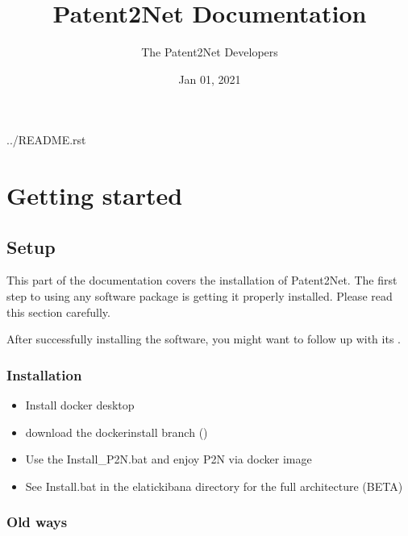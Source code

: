 \documentclass[letterpaper,10pt,english]{sphinxmanual}
\title{Patent2Net Documentation}
\date{Jan 01, 2021}
\author{The Patent2Net Developers}
\begin{document}
\pagestyle{empty}
\sphinxmaketitle
\pagestyle{plain}
\sphinxtableofcontents
\pagestyle{normal}
\label{\detokenize{index::doc}}


../README.rst


\chapter{Getting started}
\label{\detokenize{index:getting-started}}

\section{Setup}
\label{\detokenize{setup:setup}}\label{\detokenize{setup:id1}}\label{\detokenize{setup::doc}}
This part of the documentation covers the installation of Patent2Net.
The first step to using any software package is getting it properly installed.
Please read this section carefully.

After successfully installing the software, you might want to
follow up with its {\hyperref[\detokenize{configure:configuration}]{}}.


\subsection{Installation}
\label{\detokenize{setup:installation}}\begin{itemize}
\item {} 
Install docker desktop

\item {} 
download the docker\sphinxhyphen{}install branch ()

\item {} 
Use the Install\_P2N.bat and enjoy P2N via docker image

\item {} 
See Install.bat in the elatickibana directory for the full architecture (BETA)

\end{itemize}


\subsection{Old ways}
\label{\detokenize{setup:old-ways}}
\end{document}
